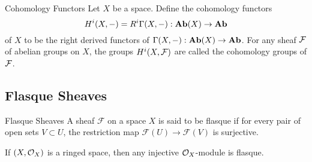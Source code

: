 \documentclass[a4paper]{article}
\begin{document}
\begin{defn}{Cohomology Functors}{} Let $X$ be a space. Define the cohomology functors $$H^i(X,-)=R^i\Gamma(X,-):\bold{Ab}(X)\to\bold{Ab}$$ of $X$ to be the right derived functors of $\Gamma(X,-):\bold{Ab}(X)\to\bold{Ab}$. For any sheaf $\mathcal{F}$ of abelian groups on $X$, the groups $H^i(X,\mathcal{F})$ are called the cohomology groups of $\mathcal{F}$. 
\end{defn}

\subsection{Flasque Sheaves}
\begin{defn}{Flasque Sheaves}{} A sheaf $\mathcal{F}$ on a space $X$ is said to be flasque if for every pair of open sets $V\subset U$, the restriction map $\mathcal{F}(U)\to\mathcal{F}(V)$ is surjective. 
\end{defn}

\begin{lmm}{}{} If $(X,\mathcal{O}_X)$ is a ringed space, then any injective $\mathcal{O}_X$-module is flasque. 
\end{lmm}
\end{document}
